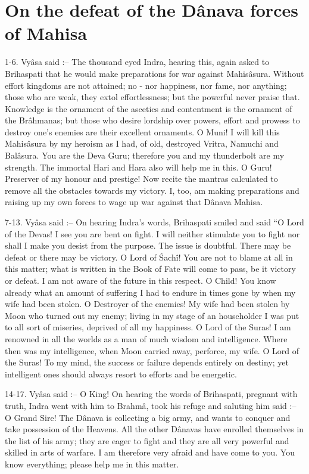 ﻿\chapter{On the defeat of the D\^anava forces of Mahisa}

1-6. Vy\^asa said :-- The thousand eyed Indra, hearing this, again asked to Brihaspati that he would make preparations for war against Mahis\^asura. Without effort kingdoms are not attained; no - nor happiness, nor fame, nor anything; those who are weak, they extol effortlessness; but the powerful never praise that. Knowledge is the ornament of the ascetics and contentment is the ornament of the Br\^ahmanas; but those who desire lordship over powers, effort and prowess to destroy one's enemies are their excellent ornaments. O Muni! I will kill this Mahis\^asura by my heroism as I had, of old, destroyed Vritra, Namuchi and Bal\^asura. You are the Deva Guru; therefore you and my thunderbolt are my strength. The immortal Hari and Hara also will help me in this. O Guru! Preserver of my honour and prestige! Now recite the mantras calculated to remove all the obstacles towards my victory. I, too, am making preparations and raising up my own forces to wage up war against that D\^anava Mahisa.

7-13. Vy\^asa said :-- On hearing Indra's words, Brihaspati smiled and said ``O Lord of the Devas! I see you are bent on fight. I will neither stimulate you to fight nor shall I make you desist from the purpose. The issue is doubtful. There may be defeat or there may be victory. O Lord of \'Sach\^i! You are not to blame at all in this matter; what is written in the Book of Fate will come to pass, be it victory or defeat. I am not aware of the future in this respect. O Child! You know already what an amount of suffering I had to endure in times gone by when my wife had been stolen. O Destroyer of the enemies! My wife had been stolen by Moon who turned out my enemy; living in my stage of an householder I was put to all sort of miseries, deprived of all my happiness. O Lord of the Suras! I am renowned in all the worlds as a man of much wisdom and intelligence. Where then was my intelligence, when Moon carried away, perforce, my wife. O Lord of the Suras! To my mind, the success or failure depends entirely on destiny; yet intelligent ones should always resort to efforts and be energetic.

14-17. Vy\^asa said :-- O King! On hearing the words of Brihaspati, pregnant with truth, Indra went with him to Brahm\^a, took his refuge and saluting him said :-- O Grand Sire! The D\^anava is collecting a big army, and wants to conquer and take possession of the Heavens. All the other D\^anavas have enrolled themselves in the list of his army; they are eager to fight and they are all very powerful and skilled in arts of warfare. I am therefore very afraid and have come to you. You know everything; please help me in this matter.


